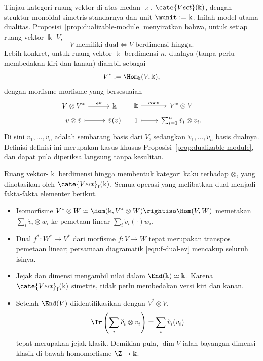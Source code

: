 \begin{example}\label{eg:Vect-trace}
	Tinjau kategori ruang vektor di atas medan $\Bbbk$,
	$\cate{Vect}(\Bbbk)$, dengan struktur monoidal simetris standarnya dan
	unit $\munit:=\Bbbk$. Inilah model utama dualitas.
	Proposisi~\ref{prop:dualizable-module} menyiratkan bahwa, untuk setiap ruang
	vektor-$\Bbbk$ $V$,
	\[ V \;\text{memiliki dual} \iff V \;\text{berdimensi hingga}. \]
	Lebih konkret, untuk ruang vektor-$\Bbbk$ berdimensi $n$, dualnya
	(tanpa perlu membedakan kiri dan kanan) diambil sebagai
	\[ V^* := \Hom_{\Bbbk}(V, \Bbbk), \]
	dengan morfisme-morfisme yang bersesuaian
	\[\begin{tikzcd}[row sep=tiny]
		V \otimes V^* \arrow[r, "{\mathrm{ev}}"] & \Bbbk \\
		v \otimes \check{v} \arrow[mapsto, r] & \check{v}(v)
	\end{tikzcd} \quad \begin{tikzcd}[row sep=tiny]
		\Bbbk \arrow[r, "{\mathrm{coev}}"] & V^* \otimes V \\
		1 \arrow[mapsto, r] & \sum_{i=1}^n \check{v}_i \otimes v_i.
	\end{tikzcd} \]
	Di sini $v_1,\ldots,v_n$ adalah sembarang basis dari $V$, sedangkan
	$\check v_1,\ldots,\check v_n$ basis dualnya. Definisi-definisi ini
	merupakan kasus khusus Proposisi~\ref{prop:dualizable-module}, dan dapat
	pula diperiksa langsung tanpa kesulitan.

	Ruang vektor-$\Bbbk$ berdimensi hingga membentuk kategori kaku terhadap
	$\otimes$, yang dinotasikan oleh $\cate{Vect}_{\mathrm f}(\Bbbk)$.
	Semua operasi yang melibatkan dual menjadi fakta-fakta elementer berikut.
	\begin{itemize}
		\item Isomorfisme
		$V^*\otimes W\simeq\Hom(\Bbbk,V^*\otimes W)\rightiso\Hom(V,W)$
		memetakan $\sum_i\check v_i\otimes w_i$ ke pemetaan linear
		$\sum_i\check v_i(\mathord\cdot)w_i$.
		\item Dual $f^*:W^*\to V^*$ dari morfisme $f:V\to W$ tepat merupakan
		transpos pemetaan linear; persamaan diagramatik
		\eqref{eqn:f-dual-ev} mencakup seluruh isinya.
		\item Jejak dan dimensi mengambil nilai dalam
		$\End(\Bbbk)\simeq\Bbbk$. Karena
		$\cate{Vect}_{\mathrm f}(\Bbbk)$ simetris, tidak perlu membedakan
		versi kiri dan kanan.
		\item Setelah $\End(V)$ diidentifikasikan dengan $V^*\otimes V$,
		\[ \Tr\left(\sum_i\check v_i\otimes v_i\right)=
		\sum_i\check v_i(v_i) \]
		tepat merupakan jejak klasik. Demikian pula, $\dim V$ ialah bayangan
		dimensi klasik di bawah homomorfisme $\Z\to\Bbbk$.
	\end{itemize}
\end{example}

